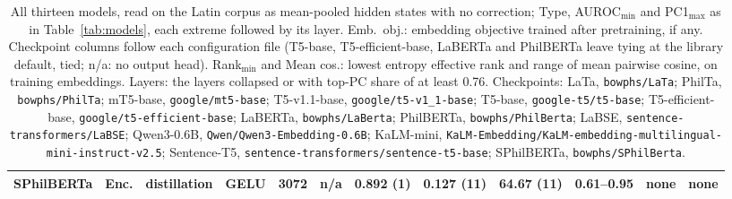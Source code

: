 \begin{table}[t]
\begin{tabular}{@{}lllllrccccll@{}}
SPhilBERTa & Enc. & distillation & GELU & 3072 & n/a & 0.892 (1) & 0.127 (11) & 64.67 (11) & 0.61--0.95 & none & none \\
\bottomrule
\end{tabular}
\caption{All thirteen models, read on the Latin corpus as mean-pooled hidden states with no correction; Type, AUROC$_{\min}$ and PC1$_{\max}$ as in Table~\ref{tab:models}, each extreme followed by its layer. Emb.\ obj.: embedding objective trained after pretraining, if any. Checkpoint columns follow each configuration file (T5-base, T5-efficient-base, LaBERTa and PhilBERTa leave tying at the library default, tied; n/a: no output head). Rank$_{\min}$ and Mean cos.: lowest entropy effective rank and range of mean pairwise cosine, on training embeddings. Layers: the layers collapsed or with top-PC share of at least 0.76. Checkpoints: LaTa, \texttt{bowphs/\allowbreak{}LaTa}; PhilTa, \texttt{bowphs/\allowbreak{}PhilTa}; mT5-base, \texttt{google/\allowbreak{}mt5-\allowbreak{}base}; T5-v1.1-base, \texttt{google/\allowbreak{}t5-\allowbreak{}v1\_1-\allowbreak{}base}; T5-base, \texttt{google-\allowbreak{}t5/\allowbreak{}t5-\allowbreak{}base}; T5-efficient-base, \texttt{google/\allowbreak{}t5-\allowbreak{}efficient-\allowbreak{}base}; LaBERTa, \texttt{bowphs/\allowbreak{}LaBerta}; PhilBERTa, \texttt{bowphs/\allowbreak{}PhilBerta}; LaBSE, \texttt{sentence-\allowbreak{}transformers/\allowbreak{}LaBSE}; Qwen3-0.6B, \texttt{Qwen/\allowbreak{}Qwen3-\allowbreak{}Embedding-\allowbreak{}0.6B}; KaLM-mini, \texttt{KaLM-\allowbreak{}Embedding/\allowbreak{}KaLM-\allowbreak{}embedding-\allowbreak{}multilingual-\allowbreak{}mini-\allowbreak{}instruct-\allowbreak{}v2.5}; Sentence-T5, \texttt{sentence-\allowbreak{}transformers/\allowbreak{}sentence-\allowbreak{}t5-\allowbreak{}base}; SPhilBERTa, \texttt{bowphs/\allowbreak{}SPhilBerta}.}
\label{tab:all_models}
\end{table}
